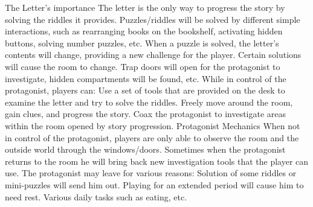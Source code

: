 \documentclass[archE1,portrait]{baposter}
\begin{document}
\begin{poster}
{}


{ 
	\begin{outline}
		\1 The Letter's importance
			\2 The letter is the only way to progress the story by solving the riddles it provides.
				\3 Puzzles/riddles will be solved by different simple interactions, such as rearranging books on the bookshelf, activating hidden buttons, solving number puzzles, etc.
			\2 When a puzzle is solved, the letter's contents will change, providing a new challenge for the player.
			\2 Certain solutions will cause the room to change.
				\3 Trap doors will open for the protagonist to investigate, hidden compartments will be found, etc.
		\1 While in control of the protagonist, players can:
			\2 Use a set of tools that are provided on the desk to examine the letter and try to solve the riddles.
			\2 Freely move around the room, gain clues, and progress the story.
			\2 Coax the protagonist to investigate areas within the room opened by story progression.
		\1 Protagonist Mechanics
			\2 When not in control of the protagonist, players are only able to observe the room and the outside world through the windows/doors.
			\2 Sometimes when the protagonist returns to the room he will bring back new investigation tools that the player can use.
			\2 The protagonist may leave for various reasons:
				\3 Solution of some riddles or mini-puzzles will send him out.
				\3 Playing for an extended period will cause him to need rest.
				\3 Various daily tasks such as eating, etc.
	\end{outline}
}

\end{poster}
\end{document}
